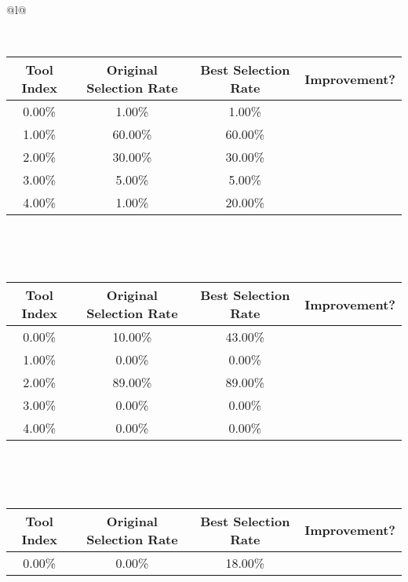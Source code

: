 \begin{longtable}{@{}l@{}}
\begin{minipage}{\textwidth}
\noindent{}\\[0.7ex]
\begin{tabular}{|c|c|c|c|} \hline
\textbf{Tool Index} & \textbf{Original Selection Rate} & \textbf{Best Selection Rate} & \textbf{Improvement?} \\ \hline
0.00\% & 1.00\% & 1.00\% & \textcolor{red}{\ding{55}} \\ \hline
1.00\% & 60.00\% & 60.00\% & \textcolor{red}{\ding{55}} \\ \hline
2.00\% & 30.00\% & 30.00\% & \textcolor{red}{\ding{55}} \\ \hline
3.00\% & 5.00\% & 5.00\% & \textcolor{red}{\ding{55}} \\ \hline
4.00\% & 1.00\% & 20.00\% & \textcolor{green}{\ding{51}} \\ \hline
\end{tabular}
\end{minipage}\\[2ex]
\begin{minipage}{\textwidth}
\noindent{}\\[0.7ex]
\begin{tabular}{|c|c|c|c|} \hline
\textbf{Tool Index} & \textbf{Original Selection Rate} & \textbf{Best Selection Rate} & \textbf{Improvement?} \\ \hline
0.00\% & 10.00\% & 43.00\% & \textcolor{green}{\ding{51}} \\ \hline
1.00\% & 0.00\% & 0.00\% & \textcolor{red}{\ding{55}} \\ \hline
2.00\% & 89.00\% & 89.00\% & \textcolor{red}{\ding{55}} \\ \hline
3.00\% & 0.00\% & 0.00\% & \textcolor{red}{\ding{55}} \\ \hline
4.00\% & 0.00\% & 0.00\% & \textcolor{red}{\ding{55}} \\ \hline
\end{tabular}
\end{minipage}\\[2ex]
\begin{minipage}{\textwidth}
\noindent{}\\[0.7ex]
\begin{tabular}{|c|c|c|c|} \hline
\textbf{Tool Index} & \textbf{Original Selection Rate} & \textbf{Best Selection Rate} & \textbf{Improvement?} \\ \hline
0.00\% & 0.00\% & 18.00\% & \textcolor{green}{\ding{51}} \\ \hline

\end{tabular}
\end{minipage}
\end{longtable}

